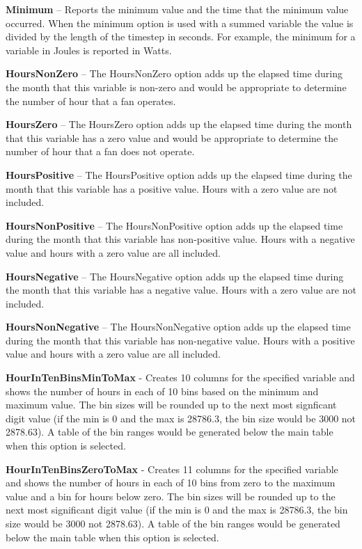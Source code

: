 \textbf{Minimum} -- Reports the minimum value and the time that the minimum value occurred. When the minimum option is used with a summed variable the value is divided by the length of the timestep in seconds. For example, the minimum for a variable in Joules is reported in Watts.

\textbf{HoursNonZero} -- The HoursNonZero option adds up the elapsed time during the month that this variable is non-zero and would be appropriate to determine the number of hour that a fan operates.

\textbf{HoursZero} -- The HoursZero option adds up the elapsed time during the month that this variable has a zero value and would be appropriate to determine the number of hour that a fan does not operate.

\textbf{HoursPositive} -- The HoursPositive option adds up the elapsed time during the month that this variable has a positive value. Hours with a zero value are not included.

\textbf{HoursNonPositive} -- The HoursNonPositive option adds up the elapsed time during the month that this variable has non-positive value. Hours with a negative value and hours with a zero value are all included.

\textbf{HoursNegative} -- The HoursNegative option adds up the elapsed time during the month that this variable has a negative value. Hours with a zero value are not included.

\textbf{HoursNonNegative} -- The HoursNonNegative option adds up the elapsed time during the month that this variable has non-negative value. Hours with a positive value and hours with a zero value are all included.

\textbf{HourInTenBinsMinToMax} - Creates 10 columns for the specified variable and shows the number of hours in each of 10 bins based on the minimum and maximum value. The bin sizes will be rounded up to the next most signficant digit value (if the min is 0 and the max is 28786.3, the bin size would be 3000 not 2878.63). A table of the bin ranges would be generated below the main table when this option is selected.

\textbf{HourInTenBinsZeroToMax} - Creates 11 columns for the specified variable and shows the number of hours in each of 10 bins from zero to the maximum value and a bin for hours below zero. The bin sizes will be rounded up to the next most significant digit value (if the min is 0 and the max is 28786.3, the bin size would be 3000 not 2878.63). A table of the bin ranges would be generated below the main table when this option is selected.


